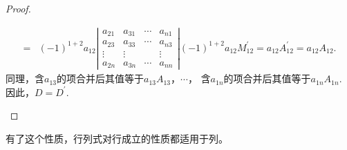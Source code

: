 \documentclass[10pt,a4paper%
tablecaptionabove]{article}
\begin{document}
\begin{CJK}{UTF8}{gkai}
\begin{proof}
\begin{enumerate}
$$\begin{aligned}
        = &(-1)^{1+2} a_{12}
        \left|
          \begin{array}{cccc}
            a_{21} & a_{31} & \cdots & a_{n1} \\
            a_{23} & a_{33} & \cdots & a_{n3} \\
            \vdots & \vdots & & \vdots \\
            a_{2n} & a_{3n} & \cdots & a_{nn}        
          \end{array}
        \right| (-1)^{1+2}a_{12} M_{12}^\prime  = a_{12} A_{12}^\prime = a_{12} A_{12}. 
      \end{aligned}
      $$
      同理，含$a_{13}$的项合并后其值等于$a_{13}A_{13}$，$\cdots$，
      含$a_{1n}$的项合并后其值等于$a_{1n}A_{1n}$. 因此，$D=D^\prime$.
    \end{enumerate}

  \end{proof}
  \begin{zhu}
    有了这个性质，行列式对行成立的性质都适用于列。
  \end{zhu}
  

\end{CJK}
\end{document}
